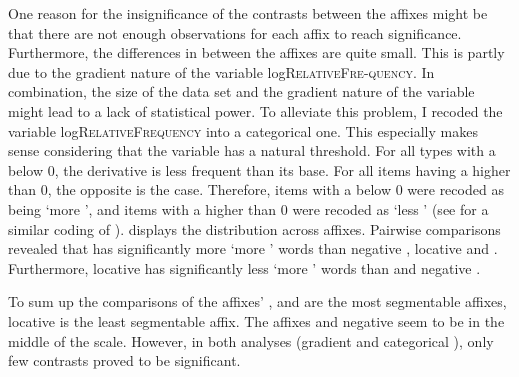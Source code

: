 One reason for the insignificance of the contrasts between the affixes might be that there are not enough observations for each affix to reach significance. Furthermore, the differences in  between the affixes are quite small. This is partly due to the gradient nature of the variable log\textsc{RelativeFre-quency}. In combination, the size of the data set and the gradient nature of the variable might lead to a lack of statistical power. 
To alleviate this problem, I recoded the variable log\textsc{RelativeFrequency} into a categorical one. This especially makes sense considering that the variable has a natural threshold. For all types with a  below 0, the derivative is less frequent than its base. For all items having a  higher than 0, the opposite is the case. Therefore, items with a  below 0 were recoded as being `more ', and items with a  higher than 0 were recoded as `less ' (see \citealt{Hay.2001,Collie.2008} for a similar coding of ).  displays the distribution across affixes.
Pairwise comparisons revealed that  has significantly more `more ' words  than negative , locative  and . Furthermore, locative  has significantly less  `more ' words than  and negative . 







To sum up the comparisons of the affixes' ,  and  are the most segmentable affixes, locative  is the least segmentable affix. The affixes  and negative  seem to be in the middle of the scale. However, in both analyses (gradient and categorical ), only few contrasts proved to be significant.






